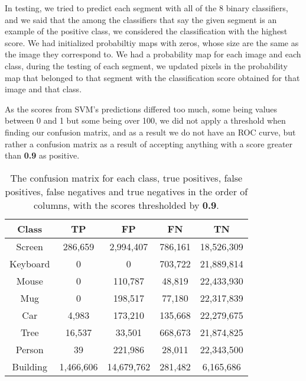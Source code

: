 \documentclass[conference]{IEEEtran}
\begin{document}
In testing, we tried to predict each segment with all of the 8 binary classifiers, and we said that the among the classifiers that say the given segment is an example of the positive class, we considered the classification with the highest score. We had initialized probabiltiy maps with zeros, whose size are the same as the image they correspond to. We had a probability map for each image and each class, during the testing of each segment, we updated pixels in the probability map that belonged to that segment with the classification score obtained for that image and that class.

As the scores from SVM's predictions differed too much, some being values between 0 and 1 but some being over 100, we did not apply a threshold when finding our confusion matrix, and as a result we do not have an ROC curve, but rather a confusion matrix as a result of accepting anything with a score greater than \textbf{0.9} as positive.

\begin{table}[!h]
\caption{The confusion matrix for each class, true positives, false positives, false negatives and true negatives in the order of columns, with the scores thresholded by \textbf{0.9}.}
\label{table_example}
\centering
\begin{tabular}{||c|c|c|c|c||}
\hline
Class & TP & FP & FN & TN \\
\hline
Screen & 286,659 & 2,994,407 & 786,161 & 18,526,309 \\
\hline
Keyboard & 0 & 0 & 703,722 & 21,889,814 \\
\hline
Mouse & 0 & 110,787 & 48,819 & 22,433,930 \\
\hline
Mug & 0 & 198,517 & 77,180 & 22,317,839 \\
\hline
Car & 4,983 & 173,210 & 135,668 & 22,279,675 \\
\hline
Tree & 16,537 & 33,501 & 668,673 & 21,874,825 \\
\hline
Person & 39 & 221,986 & 28,011 & 22,343,500 \\
\hline
Building & 1,466,606 & 14,679,762 & 281,482 & 6,165,686 \\
\hline
\end{tabular}
\end{table}
\end{document}
